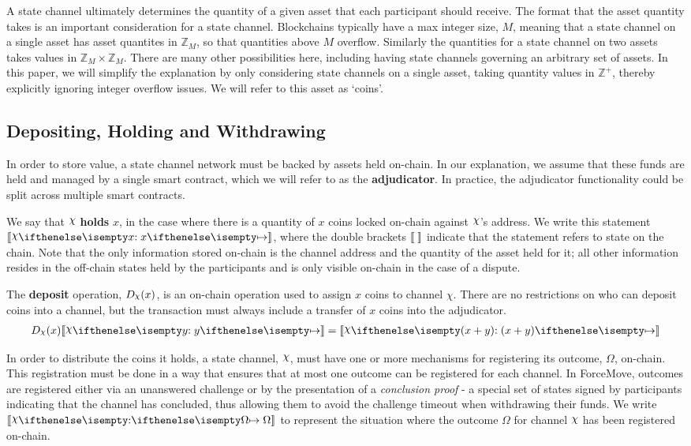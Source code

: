\documentclass{article}
\begin{document}
A state channel ultimately determines the quantity of a given asset that each participant should receive.
The format that the asset quantity takes is an important consideration for a state channel.
Blockchains typically have a max integer size, $M$, meaning that a state channel on a single asset
has asset quantites in $\mathbb{Z}_M$, so that quantities above $M$ overflow.
Similarly the quantities for a state channel on two assets takes values in $\mathbb{Z}_M \times \mathbb{Z}_M$.
There are many other possibilities here, including having state channels governing an arbitrary set of assets.
In this paper, we will simplify the explanation by only considering state channels on a single
asset, taking quantity values in $\mathbb{Z}^+$, thereby explicitly ignoring integer overflow issues.
We will refer to this asset as `coins'.

\subsection{Depositing, Holding and Withdrawing}

In order to store value, a state channel network must be backed by assets held on-chain.
In our explanation, we assume that these funds are held and managed by a single smart contract,
which we will refer to as the \textbf{adjudicator}.
In practice, the adjudicator functionality could be split across multiple smart contracts.

We say that $\rchi$ \textbf{holds} $x$, in the case where there is a quantity of $x$ coins
locked on-chain against $\rchi$'s address.
We write this statement $\adj{\holds{\rchi}{x}{}}$,
where the double brackets $\llbracket \; \rrbracket$ indicate that the statement refers to state on the chain.
Note that the only information stored on-chain is the channel address and the quantity of the asset held for it;
all other information resides in the off-chain states held by the participants and is only visible on-chain in the case of a dispute.

The \textbf{deposit} operation, $D_\rchi(x)$, is an on-chain operation used to assign $x$ coins to channel $\chi$.
There are no restrictions on who can deposit coins into a channel, but the
transaction must always include a transfer of $x$ coins into the adjudicator.
\begin{align}
D_\rchi(x) \adj{\holds{\rchi}{y}{}} = \adj{\holds{\rchi}{(x + y)}{}}
\end{align}

In order to distribute the coins it holds, a state channel, $\rchi$, must have one or more mechanisms for
registering its outcome, $\Omega$, on-chain.
This registration must be done in a way that ensures that at most one outcome can be registered for each channel.
In ForceMove, outcomes are registered either via an unanswered challenge or by the presentation
of a \textit{conclusion proof} - a special set of states signed by participants indicating
that the channel has concluded, thus allowing them to avoid the challenge timeout when withdrawing their funds.
We write $\adj{\holds{\rchi}{}{\Omega}}$ to represent the situation where the outcome $\Omega$ for channel $\rchi$ has been registered on-chain.
\end{document}
